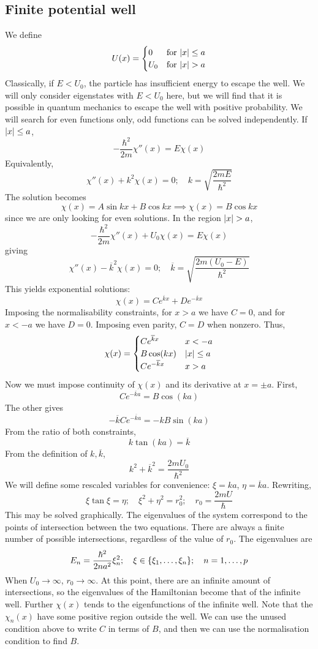 \subsection{Finite potential well}
We define
\[
	U(x) = \begin{cases}
		0   & \text{for } \abs{x} \leq a \\
		U_0 & \text{for } \abs{x} > a
	\end{cases}
\]
Classically, if \( E < U_0 \), the particle has insufficient energy to escape the well.
We will only consider eigenstates with \( E < U_0 \) here, but we will find that it is possible in quantum mechanics to escape the well with positive probability.
We will search for even functions only, odd functions can be solved independently.
If \( \abs{x} \leq a \),
\[
	-\frac{\hbar^2}{2m} \chi''(x) = E\chi(x)
\]
Equivalently,
\[
	\chi''(x) + k^2 \chi(x) = 0;\quad k = \sqrt{\frac{2mE}{\hbar^2}}
\]
The solution becomes
\[
	\chi(x) = A \sin kx + B \cos kx \implies \chi(x) = B \cos kx
\]
since we are only looking for even solutions.
In the region \( \abs{x} > a \),
\[
	-\frac{\hbar^2}{2m} \chi''(x) + U_0 \chi(x) = E \chi(x)
\]
giving
\[
	\chi''(x) - \overline k^2 \chi(x) = 0;\quad \overline k = \sqrt{\frac{2m(U_0 - E)}{\hbar^2}}
\]
This yields exponential solutions:
\[
	\chi(x) = C e^{\overline k x} + D e^{-\overline k x}
\]
Imposing the normalisability constraints, for \( x > a \) we have \( C = 0 \), and for \( x < -a \) we have \( D = 0 \).
Imposing even parity, \( C = D \) when nonzero.
Thus,
\[
	\chi(x) = \begin{cases}
		C e^{\overline k x}  & x < -a         \\
		B \cos(kx)           & \abs{x} \leq a \\
		C e^{-\overline k x} & x > a
	\end{cases}
\]
Now we must impose continuity of \( \chi(x) \) and its derivative at \( x = \pm a \).
First,
\[
	C e^{-\overline k a} = B \cos(k a)
\]
The other gives
\[
	-\overline k C e^{-\overline k a} = -k B \sin(k a)
\]
From the ratio of both constraints,
\[
	k \tan (ka) = \overline k
\]
From the definition of \( k, \overline k \),
\[
	k^2 + \overline k^2 = \frac{2mU_0}{\hbar^2}
\]
We will define some rescaled variables for convenience: \( \xi = ka \), \( \eta = \overline k a \).
Rewriting,
\[
	\xi \tan \xi = \eta;\quad \xi^2 + \eta^2 = r_0^2;\quad r_0 = \frac{2mU}{\hbar}
\]
This may be solved graphically.
The eigenvalues of the system correspond to the points of intersection between the two equations.
There are always a finite number of possible intersections, regardless of the value of \( r_0 \).
The eigenvalues are
\[
	E_n = \frac{\hbar^2}{2 n a^2} \xi_n^2;\quad \xi \in \qty{\xi_1, \dots, \xi_n};\quad n = 1, \dots, p
\]
When \( U_0 \to \infty \), \( r_0 \to \infty \).
At this point, there are an infinite amount of intersections, so the eigenvalues of the Hamiltonian become that of the infinite well.
Further \( \chi(x) \) tends to the eigenfunctions of the infinite well.
Note that the \( \chi_n(x) \) have some positive region outside the well.
We can use the unused condition above to write \( C \) in terms of \( B \), and then we can use the normalisation condition to find \( B \).

